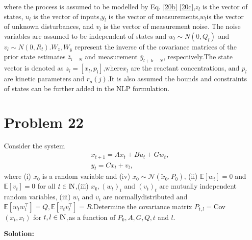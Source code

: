 \documentclass[a4paper,11pt,reqno]{amsart}
\newcommand{\N}{{\rm I\!N}}
\newcommand{\tran}{\intercal}
\begin{document}
where the process is assumed to be modelled by Eq. \ref{20b} \ref{20c},$z_l$  is the vector of states,
$u_l$ is the vector of inputs,$y_l$ is the vector of measurements,$w_l$is the vector of unknown disturbances, and
$v_l$  is the vector of measurement noise. The noise variables are assumed to be independent of states and 
$w_l \sim N(0,Q_l)$ and $v_l \sim N(0,R_l)$.$W_z,W_y$ represent the inverse of the covariance matrices of the prior state estimates
$\overline{z}_{l-N}$ and measurement $\overline{y}_{l+k-N}$, respectively.The state vector is denoted as  
$z_l=[x_l,p_l]$,where$x_l$ are  the reactant concentrations, and $p_l$ are kinetic parameters and
$r_a(j)$.It is also assumed the bounds and constraints of states can be further added in the NLP formulation.

\section{Problem 22}
Consider the system
$$
\begin{aligned}
    &x_{t+1}=Ax_t+Bu_t+Gw_t,
    \\
    &y_t=Cx_t+v_t,
\end{aligned}
$$
where (i) $x_0$ is a random variable and (iv) $x_0 \sim \mathcal{N}(\widetilde{x}_0,P_0)$,
(ii) $\mathbb{E}[w_t]=0$ and $\mathbb{E}[v_t]=0$ for all $t\in\N$,(iii) $x_0,(w_t)_t$ and $(v_t)_t$
are mutually independent random variables, (iii) $w_t$ and $v_t$  are normallydistributed and 
$\mathbb{E}[w_tw_t^{\tran}]=Q,\mathbb{E}[v_tv_t^{\tran}]=R$.Determine the covariance matrix
$P_{t,l}=$Cov$(x_t,x_l)$ for $t,l\in\N$,as a function of $P_0,A,G,Q,t$ and $l$.

\textbf{Solotion:}
\end{document}
